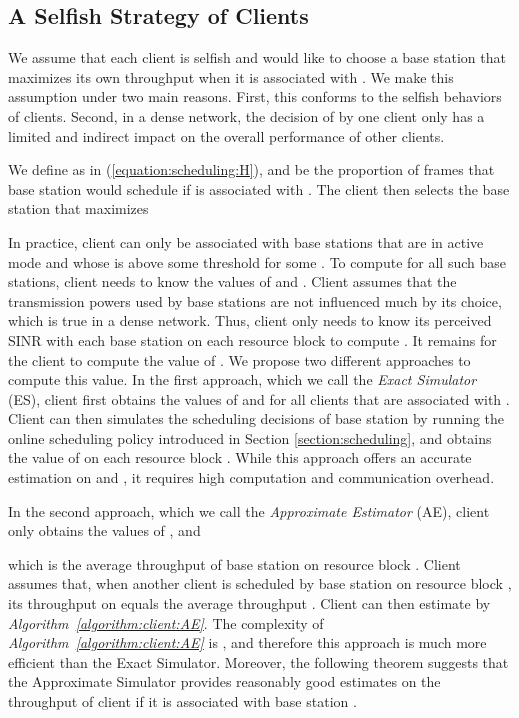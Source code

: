 \documentclass[conference]{IEEEtran}
\begin{document}
\subsection{A Selfish Strategy of Clients}

We assume that each client  is selfish and would like to choose a base station  that maximizes its own throughput when it is associated with . We make this assumption under two main reasons. First, this conforms to the selfish behaviors of clients. Second, in a dense network, the decision of  by one client  only has a limited and indirect impact on the overall performance of other clients.

We define  as in (\ref{equation:scheduling:H}), and  be the proportion of frames that base station  would schedule  if  is associated with . The client  then selects the base station  that maximizes


In practice, client  can only be associated with base stations that are in active mode and whose  is above some threshold for some . To compute  for all such base stations, client  needs to know the values of  and . Client  assumes that the transmission powers used by base stations are not influenced much by its choice, which is true in a dense network. Thus, client  only needs to know its perceived SINR with each base station on each resource block to compute . It remains for the client  to compute the value of . We propose two different approaches to compute this value. In the first approach, which we call the \emph{Exact Simulator} (ES), client  first obtains the values of  and  for all clients  that are associated with . Client  can then simulates the scheduling decisions of base station  by running the online scheduling policy introduced in Section \ref{section:scheduling}, and obtains the value of  on each resource block . While this approach offers an accurate estimation on  and , it requires high computation and communication overhead.

In the second approach, which we call the \emph{Approximate Estimator} (AE), client  only obtains the values of , and

which is the average throughput of base station  on resource block . Client  assumes that, when another client  is scheduled by base station  on resource block , its throughput on  equals the average throughput . Client  can then estimate  by \emph{Algorithm~\ref{algorithm:client:AE}}. The complexity of \emph{Algorithm~\ref{algorithm:client:AE}} is , and therefore this approach is much more efficient than the Exact Simulator. Moreover, the following theorem suggests that the Approximate Simulator provides reasonably good estimates on the throughput of client  if it is associated with base station .
\end{document}
